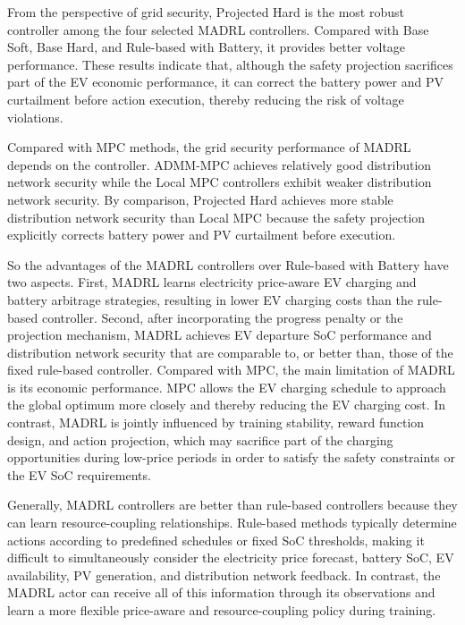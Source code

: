 From the perspective of grid security, Projected Hard is the most robust controller among the four selected MADRL controllers. Compared with Base Soft, Base Hard, and Rule-based with Battery, it provides better voltage performance. These results indicate that, although the safety projection sacrifices part of the EV economic performance, it can correct the battery power and PV curtailment before action execution, thereby reducing the risk of voltage violations.

Compared with MPC methods, the grid security performance of MADRL depends on the controller. ADMM-MPC achieves relatively good distribution network security while the Local MPC controllers exhibit weaker distribution network security. By comparison, Projected Hard achieves more stable distribution network security than Local MPC because the safety projection explicitly corrects battery power and PV curtailment before execution.

So the advantages of the MADRL controllers over Rule-based with Battery have two aspects. First, MADRL learns electricity price-aware EV charging and battery arbitrage strategies, resulting in lower EV charging costs than the rule-based controller. Second, after incorporating the progress penalty or the projection mechanism, MADRL achieves EV departure SoC performance and distribution network security that are comparable to, or better than, those of the fixed rule-based controller. Compared with MPC, the main limitation of MADRL is its economic performance. MPC allows the EV charging schedule to approach the global optimum more closely and thereby reducing the EV charging cost. In contrast, MADRL is jointly influenced by training stability, reward function design, and action projection, which may sacrifice part of the charging opportunities during low-price periods in order to satisfy the safety constraints or the EV SoC requirements.

Generally, MADRL controllers are better than rule-based controllers because they can learn resource-coupling relationships. Rule-based methods typically determine actions according to predefined schedules or fixed SoC thresholds, making it difficult to simultaneously consider the electricity price forecast, battery SoC, EV availability, PV generation, and distribution network feedback. In contrast, the MADRL actor can receive all of this information through its observations and learn a more flexible price-aware and resource-coupling policy during training.

